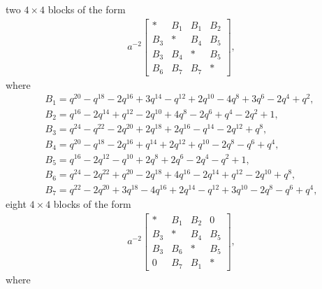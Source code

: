\documentclass[10pt,a4paper]{amsart}
\numberwithin{equation}{section}
\theoremstyle{definition}
\newcommand{\flac}[2]{#1}
\begin{document}
two $4 \times 4$ blocks of the form
\begin{align*}
 a^{-2}\begin{bmatrix}
 * & B_1 & B_1 & B_2 \\
 B_3 & * & B_4 & B_5 \\
 B_3 & B_4 & * & B_5 \\
 B_6 & B_7 & B_7 & *
 \end{bmatrix},
\end{align*}
where
\begin{gather*}
 B_1 = \flac{q^{20}}{a^2}-\flac{q^{18}}{a^2}-\flac{2q^{16}}{a^2}+\flac{3q^{14}}{a^2}-\flac{q^{12}}{a^2}+\flac{2q^{10}}{a^2}-\flac{4q^{8}}{a^2}+\flac{3q^{6}}{a^2}-\flac{2q^{4}}{a^2}+\flac{q^{2}}{a^2}, \\
 B_2 = \flac{q^{16}}{a^2}-\flac{2q^{14}}{a^2}+\flac{q^{12}}{a^2}-\flac{2q^{10}}{a^2}+\flac{4q^{8}}{a^2}-\flac{2q^{6}}{a^2}+\flac{q^{4}}{a^2}-\flac{2q^{2}}{a^2}+\flac{1}{a^2}, \\
 B_3 = \flac{q^{24}}{a^2}-\flac{q^{22}}{a^2}-\flac{2q^{20}}{a^2}+\flac{2q^{18}}{a^2}+\flac{2q^{16}}{a^2}-\flac{q^{14}}{a^2}-\flac{2q^{12}}{a^2}+\flac{q^{8}}{a^2}, \\
 B_4 = \flac{q^{20}}{a^2}-\flac{q^{18}}{a^2}-\flac{2q^{16}}{a^2}+\flac{q^{14}}{a^2}+\flac{2q^{12}}{a^2}+\flac{q^{10}}{a^2}-\flac{2q^{8}}{a^2}-\flac{q^{6}}{a^2}+\flac{q^{4}}{a^2}, \\
 B_5 = \flac{q^{16}}{a^2}-\flac{2q^{12}}{a^2}-\flac{q^{10}}{a^2}+\flac{2q^{8}}{a^2}+\flac{2q^{6}}{a^2}-\flac{2q^{4}}{a^2}-\flac{q^{2}}{a^2}+\flac{1}{a^2}, \\
 B_6 = \flac{q^{24}}{a^2}-\flac{2q^{22}}{a^2}+\flac{q^{20}}{a^2}-\flac{2q^{18}}{a^2}+\flac{4q^{16}}{a^2}-\flac{2q^{14}}{a^2}+\flac{q^{12}}{a^2}-\flac{2q^{10}}{a^2}+\flac{q^{8}}{a^2}, \\
 B_7 = \flac{q^{22}}{a^2}-\flac{2q^{20}}{a^2}+\flac{3q^{18}}{a^2}-\flac{4q^{16}}{a^2}+\flac{2q^{14}}{a^2}-\flac{q^{12}}{a^2}
 +\flac{3q^{10}}{a^2}-\flac{2q^{8}}{a^2}-\flac{q^{6}}{a^2}+\flac{q^{4}}{a^2},
\end{gather*}
eight $4 \times 4$ blocks of the form
\begin{align*}
 a^{-2} \begin{bmatrix}
 * & B_1 & B_2 & 0 \\
 B_3 & * & B_4 & B_5 \\
 B_3 & B_6 & * & B_5 \\
 0 & B_7 & B_1 & *
 \end{bmatrix},
\end{align*}
where
\end{document}
